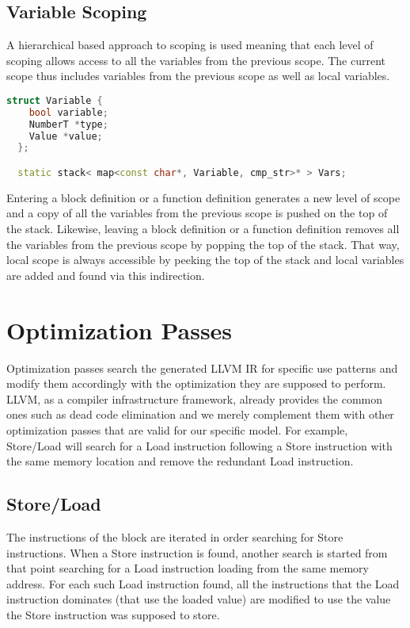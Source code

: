 \subsection{Variable Scoping}

A hierarchical based approach to scoping is used meaning that each
level of scoping allows access to all the variables from the previous
scope. The current scope thus includes variables from the previous scope as
well as local variables.

\begin{lstlisting}[language=C++]
  struct Variable {
    bool variable;
    NumberT *type;
    Value *value;
  };

  static stack< map<const char*, Variable, cmp_str>* > Vars;
\end{lstlisting}

Entering a block definition or a function definition generates a new
level of scope and a copy of all the variables from the previous scope
is pushed on the top of the stack. Likewise, leaving a block
definition or a function definition removes all the variables from the
previous scope by popping the top of the stack. That way, local scope
is always accessible by peeking the top of the stack and local
variables are added and found via this indirection.

\section{Optimization Passes}

Optimization passes search the generated LLVM IR for specific use
patterns and modify them accordingly with the optimization they are
supposed to perform. LLVM, as a compiler infrastructure framework,
already provides the common ones such as dead code elimination and we
merely complement them with other optimization passes that are valid
for our specific model. For example, Store/Load will search for a Load
instruction following a Store instruction with the same memory
location and remove the redundant Load instruction.

\subsection{Store/Load}

The instructions of the block are iterated in order searching for
Store instructions. When a Store instruction is found, another search
is started from that point searching for a Load instruction loading
from the same memory address. For each such Load instruction found,
all the instructions that the Load instruction dominates (that use the
loaded value) are modified to use the value the Store instruction was
supposed to store.

